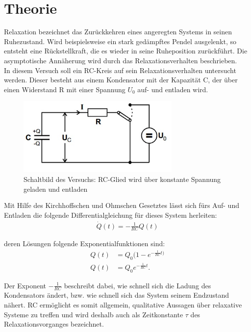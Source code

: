 

\section{Theorie}

Relaxation bezeichnet das Zurückkehren eines angeregten Systems in seinen Ruhezustand. Wird  beispielsweise ein stark gedämpftes Pendel ausgelenkt, so entsteht eine Rückstellkraft, die es wieder in seine Ruheposition zurückführt. Die asymptotische Annäherung wird durch das Relaxationsverhalten beschrieben.\\
In diesem Versuch soll ein RC-Kreis auf sein Relaxationsverhalten untersucht werden. Dieser besteht aus einem Kondensator mit der Kapazität C, der über einen Widerstand R mit einer Spannung $U_0$ auf- und entladen wird.\\
\begin{figure}[htbp]
\includegraphics[width=8cm]{_pics/aufbau.jpg}
\centering
\caption{Schaltbild des Versuchs: RC-Glied wird über konstante Spannung geladen und entladen}
\end{figure}

Mit Hilfe des Kirchhoffschen und Ohmschen Gesetztes lässt sich fürs Auf- und Entladen die folgende Differentialgleichung 
für dieses System herleiten:
\begin{align}
\dot Q(t)=-\frac{1}{RC} Q(t)
\end{align}

deren Lösungen folgende Exponentialfunktionen sind:
\begin{align}
Q(t)&=Q_0(1-e^{-\frac{1}{RC}t)}\\
Q(t)&=Q_0 e^{-\frac{1}{RC}t}.
\end{align}

Der Exponent $-\frac{1}{RC}$ beschreibt dabei, wie schnell sich die Ladung des Kondensators ändert, bzw. wie schnell sich das System seinem Endzustand nähert.
RC ermöglicht es somit allgemein, qualitative Aussagen über relaxative Systeme zu treffen und wird deshalb auch als  Zeitkonstante $\tau$ des Relaxationsvorganges bezeichnet.\\

